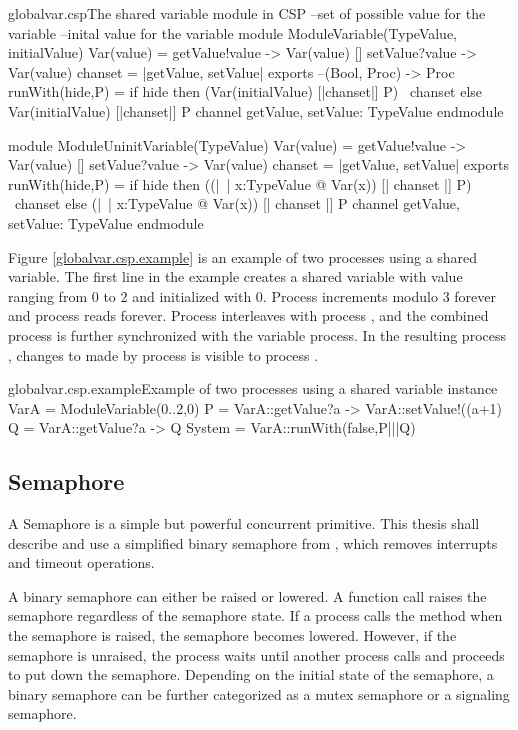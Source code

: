 \documentclass[a4paper, 12pt]{article}
\begin{document}
\begin{cspfloat}{globalvar.csp}{The shared variable module in CSP}
--set of possible value for the variable
--inital value for the variable
module ModuleVariable(TypeValue, initialValue)
  Var(value) = getValue!value -> Var(value)
             [] setValue?value -> Var(value)
  chanset = {|getValue, setValue|}
exports
  --(Bool, Proc) -> Proc
  runWith(hide,P) = if hide then (Var(initialValue) [|chanset|] P) \ chanset
                            else  Var(initialValue) [|chanset|] P
  channel getValue, setValue: TypeValue
endmodule

module ModuleUninitVariable(TypeValue)
  Var(value) = getValue!value -> Var(value)
            [] setValue?value -> Var(value)
  chanset = {|getValue, setValue|}
exports
  runWith(hide,P) = 
    if hide then ((|~| x:TypeValue @ Var(x)) [| chanset |] P) \ chanset
    else (|~| x:TypeValue @ Var(x)) [| chanset |] P
  channel getValue, setValue: TypeValue
endmodule
\end{cspfloat}

Figure \ref{globalvar.csp.example} is an example of two processes using a shared variable. The first line in the example creates a shared variable  with value ranging from $0$ to $2$ and initialized with $0$. Process  increments  modulo $3$ forever and process  reads  forever. Process  interleaves with process , and the combined process is further synchronized with the variable  process. In the resulting process , changes to  made by process  is visible to process .

\begin{cspfloat}{globalvar.csp.example}{Example of two processes using a shared variable}
instance VarA = ModuleVariable({0..2},0)
P = VarA::getValue?a -> VarA::setValue!((a+1)%
Q = VarA::getValue?a -> Q
System = VarA::runWith(false,P|||Q)
\end{cspfloat}


\subsection{Semaphore}
A Semaphore is a simple but powerful concurrent primitive. This thesis shall describe and use a simplified binary semaphore from \cite{CPinJava}, which removes interrupts and timeout operations. 

A binary semaphore can either be raised or lowered. A  function call raises the semaphore regardless of the semaphore state. If a process calls the  method when the semaphore is raised, the semaphore becomes lowered. However, if the semaphore is unraised, the process waits until another process calls  and proceeds to put down the semaphore. Depending on the initial state of the semaphore, a binary semaphore can be further categorized as a mutex semaphore or a signaling semaphore.
\end{document}
